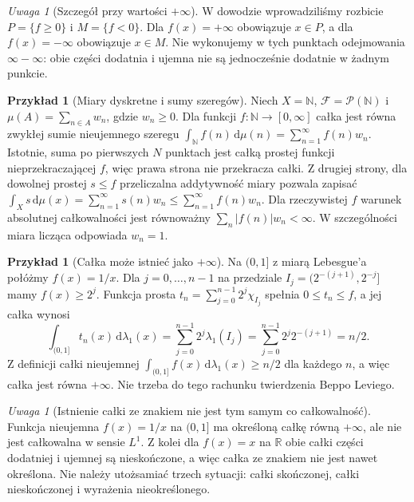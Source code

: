 \documentclass[11pt,a4paper,oneside]{book}
\numberwithin{equation}{chapter}
\theoremstyle{plain}
\theoremstyle{definition}
\newtheorem{przyklad}[twierdzenie]{Przykład}
\theoremstyle{remark}
\newtheorem{uwaga}[twierdzenie]{Uwaga}
\begin{document}
\begin{uwaga}[Szczegół przy wartości $+\infty$]
W dowodzie wprowadziliśmy rozbicie
$P=\{f\ge0\}$ i $M=\{f<0\}$.
Dla $f(x)=+\infty$ obowiązuje $x\in P$,
a dla $f(x)=-\infty$ obowiązuje $x\in M$.
Nie wykonujemy w tych punktach odejmowania
$\infty-\infty$: obie części dodatnia i ujemna
nie są jednocześnie dodatnie w żadnym punkcie.
\end{uwaga}

\begin{przyklad}[Miary dyskretne i sumy szeregów]
Niech $X=\mathbb N$, $\mathcal F=\mathcal P(\mathbb N)$
i $\mu(A)=\sum_{n\in A}w_n$, gdzie $w_n\ge0$.
Dla funkcji $f:\mathbb N\to[0,\infty]$ całka
jest równa zwykłej sumie nieujemnego szeregu
$\int_{\mathbb N} f(n)\,\mathrm d\mu(n)=
\sum_{n=1}^{\infty}f(n)w_n$.
Istotnie, suma po pierwszych $N$ punktach jest
całką prostej funkcji nieprzekraczającej $f$,
więc prawa strona nie przekracza całki.
Z drugiej strony, dla dowolnej prostej $s\le f$
przeliczalna addytywność miary pozwala zapisać
$\int_X s\,\mathrm d\mu(x)=
\sum_{n=1}^{\infty}s(n)w_n\le\sum_{n=1}^{\infty}f(n)w_n$.
Dla rzeczywistej $f$ warunek absolutnej całkowalności
jest równoważny
$\sum_n|f(n)|w_n<\infty$.
W szczególności miara licząca odpowiada $w_n=1$.
\end{przyklad}

\begin{przyklad}[Całka może istnieć jako $+\infty$]
Na $(0,1]$ z miarą Lebesgue'a połóżmy $f(x)=1/x$.
Dla $j=0,\ldots,n-1$ na przedziale
$I_j=(2^{-(j+1)},2^{-j}]$ mamy $f(x)\ge2^j$.
Funkcja prosta
$t_n=\sum_{j=0}^{n-1}2^j\chi_{I_j}$
spełnia $0\le t_n\le f$, a jej całka wynosi
\[
\int_{(0,1]}t_n(x)\,\mathrm d\lambda_1(x)
=\sum_{j=0}^{n-1}2^j\lambda_1(I_j)
=\sum_{j=0}^{n-1}2^j2^{-(j+1)}=n/2.
\]
Z definicji całki nieujemnej
$\int_{(0,1]}f(x)\,\mathrm d\lambda_1(x)\ge n/2$
dla każdego $n$, a więc całka jest równa $+\infty$.
Nie trzeba do tego rachunku twierdzenia Beppo Leviego.
\end{przyklad}

\begin{uwaga}[Istnienie całki ze znakiem nie jest tym samym co całkowalność]
Funkcja nieujemna $f(x)=1/x$ na $(0,1]$ ma
określoną całkę równą $+\infty$, ale nie jest
całkowalna w sensie $L^1$. Z kolei dla $f(x)=x$
na $\mathbb R$ obie całki części dodatniej i ujemnej
są nieskończone, a więc całka ze znakiem nie jest
nawet określona. Nie należy utożsamiać trzech sytuacji:
całki skończonej, całki nieskończonej i wyrażenia
nieokreślonego.
\end{uwaga}
\end{document}
